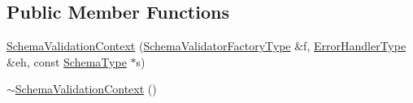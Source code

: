 \subsection*{Public Member Functions}
\begin{DoxyCompactItemize}
\item 
\mbox{\hyperlink{structrapidjson_1_1internal_1_1_schema_validation_context_a85e6773fa24ec01896db90c5998cb71d}{Schema\+Validation\+Context}} (\mbox{\hyperlink{structrapidjson_1_1internal_1_1_schema_validation_context_a1065fcde55a4928092fd576743e68e99}{Schema\+Validator\+Factory\+Type}} \&f, \mbox{\hyperlink{structrapidjson_1_1internal_1_1_schema_validation_context_aca18580c026f47ce432a5a53b71c8d24}{Error\+Handler\+Type}} \&eh, const \mbox{\hyperlink{structrapidjson_1_1internal_1_1_schema_validation_context_ae7fc7012fdcdb1b0141b73842c814644}{Schema\+Type}} $\ast$s)
\item 
\mbox{\hyperlink{structrapidjson_1_1internal_1_1_schema_validation_context_ae6837600fd9fb8c6824e17f4f24af900}{$\sim$\+Schema\+Validation\+Context}} ()
\end{DoxyCompactItemize}
